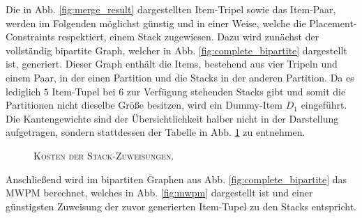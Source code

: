 Die in Abb. \ref{fig:merge_result} dargestellten Item-Tripel sowie das Item-Paar, werden im Folgenden
möglichst günstig und in einer Weise, welche die Placement-Constraints respektiert, einem Stack zugewiesen.
Dazu wird zunächst der vollständig bipartite Graph, welcher in Abb. \ref{fig:complete_bipartite} dargestellt ist,
generiert. Dieser Graph enthält die Items, bestehend aus vier Tripeln und einem Paar, in der einen Partition
und die Stacks in der anderen Partition.
Da es lediglich $5$ Item-Tupel bei $6$ zur Verfügung stehenden Stacks gibt und somit die Partitionen nicht dieselbe
Größe besitzen, wird ein Dummy-Item $D_1$ eingeführt.
Die Kantengewichte sind der Übersichtlichkeit halber nicht in der Darstellung aufgetragen, sondern stattdessen
der Tabelle in Abb. \ref{fig:item_tuple_costs_three_cap} zu entnehmen.
\begin{figure}[H]
\centering
{}
\caption{\textsc{Kosten der Stack-Zuweisungen}.}
\label{fig:item_tuple_costs_three_cap}
\end{figure}

\vfill
\pagebreak

Anschließend wird im bipartiten Graphen aus Abb. \ref{fig:complete_bipartite} das \textsc{MWPM} berechnet, welches
in Abb. \ref{fig:mwpm} dargestellt ist und einer günstigsten Zuweisung der zuvor generierten Item-Tupel zu den Stacks entspricht.

